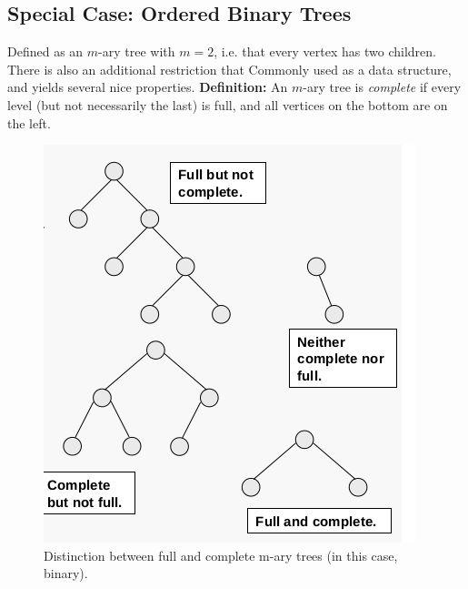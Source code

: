 \documentclass[a4paper,10pt]{report}
\begin{document}
\subsection{Special Case: Ordered Binary Trees}
Defined as an $m$-ary tree with $m=2$, i.e. that every vertex has two children. There is also an additional restriction that
Commonly used as a data structure, and yields several nice properties.
\textbf{Definition: }An $m$-ary tree  is \textit{complete} if every level (but not necessarily the last) is full, and all vertices on the bottom are on the left.
\begin{figure}[h!]
	\begin{centering}
	\begin{center}
	\includegraphics[width=\linewidth]{./full_complete.png}
	\caption{Distinction between full and complete m-ary trees (in this case, binary).}
	\label{fig:??????}
	\end{center}
	\par\end{centering}
\end{figure}
\end{document}
